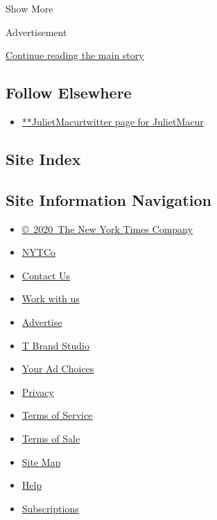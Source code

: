 Show More

Advertisement

\protect\hyperlink{after-mid2}{Continue reading the main story}

\hypertarget{follow-elsewhere}{%
\subsection{Follow Elsewhere}\label{follow-elsewhere}}

\begin{itemize}
\tightlist
\item
  \href{https://twitter.com/JulietMacur}{**JulietMacurtwitter page for
  JulietMacur}
\end{itemize}

\hypertarget{site-index}{%
\subsection{Site Index}\label{site-index}}

\hypertarget{site-information-navigation}{%
\subsection{Site Information
Navigation}\label{site-information-navigation}}

\begin{itemize}
\tightlist
\item
  \href{https://help.nytimes.com/hc/en-us/articles/115014792127-Copyright-notice}{©~2020~The
  New York Times Company}
\end{itemize}

\begin{itemize}
\tightlist
\item
  \href{https://www.nytco.com/}{NYTCo}
\item
  \href{https://help.nytimes.com/hc/en-us/articles/115015385887-Contact-Us}{Contact
  Us}
\item
  \href{https://www.nytco.com/careers/}{Work with us}
\item
  \href{https://nytmediakit.com/}{Advertise}
\item
  \href{http://www.tbrandstudio.com/}{T Brand Studio}
\item
  \href{https://www.nytimes.com/privacy/cookie-policy\#how-do-i-manage-trackers}{Your
  Ad Choices}
\item
  \href{https://www.nytimes.com/privacy}{Privacy}
\item
  \href{https://help.nytimes.com/hc/en-us/articles/115014893428-Terms-of-service}{Terms
  of Service}
\item
  \href{https://help.nytimes.com/hc/en-us/articles/115014893968-Terms-of-sale}{Terms
  of Sale}
\item
  \href{https://spiderbites.nytimes.com}{Site Map}
\item
  \href{https://help.nytimes.com/hc/en-us}{Help}
\item
  \href{https://www.nytimes.com/subscription?campaignId=37WXW}{Subscriptions}
\end{itemize}
